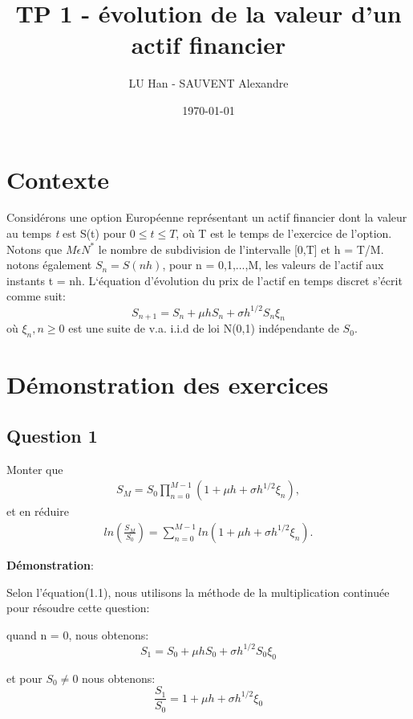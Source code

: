 \documentclass[a4paper,10pt]{report}
\title{TP 1 - évolution de la valeur d'un actif financier}
\author{LU Han - SAUVENT Alexandre}
\date{\today}
\begin{document}
\renewcommand{\labelitemi}{\large\textcolor{tatoebagreen}{\fg}}
\groovypdtitre
\restoregeometry %


\tableofcontents


\chapter{Contexte}
\noindent Considérons une option Européenne représentant un actif financier dont la valeur au temps \emph{t} est S(t) pour $0 \leq t \leq T$, où T est le temps de l'exercice de l'option. Notons que $M \epsilon N^{\ast}$ le nombre de subdivision de l'intervalle [0,T] et h = T/M. notons également $S_{n} = S(nh)$, pour n = 0,1,...,M, les valeurs de l'actif aux instants t = nh.
L‘équation d'évolution du prix de l'actif en temps discret s'écrit comme suit:
\begin{equation}
S_{n+1} = S_{n} + \mu h S_{n} + \sigma h^{1/2} S_{n} \xi_{n}   
\end{equation} 
où $\xi_{n}, n \geq 0$ est une suite de v.a. i.i.d de loi N(0,1) indépendante de $S_{0}$. 

\chapter{Démonstration des exercices}
\section{Question 1}
\noindent Monter que 
\begin{align*}
	S_{M} = S_{0} \prod_{n=0}^{M-1} (1 + \mu h + \sigma h^{1/2} \xi_{n}),
\end{align*}
\noindent et en réduire
\begin{align*}
	ln(\frac{S_{M}}{S_{0}}) = \sum_{n=0}^{M-1} ln(1  + \mu h + \sigma h^{1/2} \xi_{n}).
\end{align*}

\noindent \textbf{Démonstration}:
\par Selon l'équation(1.1), nous utilisons la méthode de la multiplication continuée pour résoudre cette question:
\par quand n = 0, nous obtenons:
\begin{equation}
	S_{1} = S_{0} + \mu h S_{0} + \sigma h^{1/2} S_{0} \xi_{0}
\end{equation} 
\par et pour $S_{0} \neq 0$ nous obtenons:
\begin{equation}
\frac{S_{1}}{S_{0}} = 1 + \mu h + \sigma h^{1/2} \xi_{0}
\end{equation} 
\end{document}
